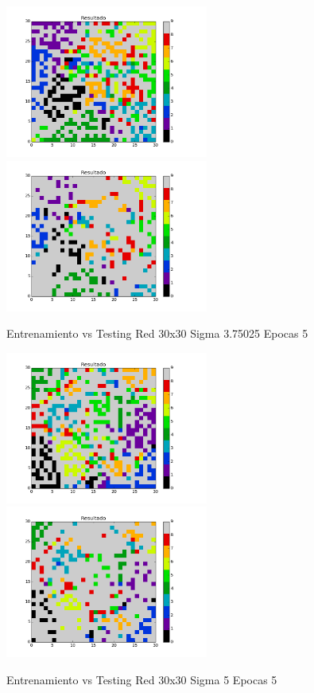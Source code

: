 \includegraphics[width=0.5\textwidth]{img/EJ2_Sigma/train_M_30_sigma_3_75025_epocas_5}
\includegraphics[width=0.5\textwidth]{img/EJ2_Sigma/test_M_30_sigma_3_75025_epocas_5}
{\center \footnotesize Entrenamiento vs Testing Red 30x30 Sigma 3.75025 Epocas 5\par}

\includegraphics[width=0.5\textwidth]{img/EJ2_Sigma/train_M_30_sigma_5_0_epocas_5}
\includegraphics[width=0.5\textwidth]{img/EJ2_Sigma/test_M_30_sigma_5_0_epocas_5}
{\center \footnotesize Entrenamiento vs Testing Red 30x30 Sigma 5 Epocas 5\par}

